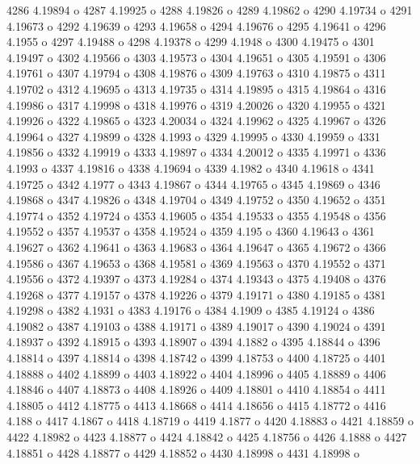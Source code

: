  4286  4.19894  o
 4287  4.19925  o
 4288  4.19826  o
 4289  4.19862  o
 4290  4.19734  o
 4291  4.19673  o
 4292  4.19639  o
 4293  4.19658  o
 4294  4.19676  o
 4295  4.19641  o
 4296  4.1955  o
 4297  4.19488  o
 4298  4.19378  o
 4299  4.1948  o
 4300  4.19475  o
 4301  4.19497  o
 4302  4.19566  o
 4303  4.19573  o
 4304  4.19651  o
 4305  4.19591  o
 4306  4.19761  o
 4307  4.19794  o
 4308  4.19876  o
 4309  4.19763  o
 4310  4.19875  o
 4311  4.19702  o
 4312  4.19695  o
 4313  4.19735  o
 4314  4.19895  o
 4315  4.19864  o
 4316  4.19986  o
 4317  4.19998  o
 4318  4.19976  o
 4319  4.20026  o
 4320  4.19955  o
 4321  4.19926  o
 4322  4.19865  o
 4323  4.20034  o
 4324  4.19962  o
 4325  4.19967  o
 4326  4.19964  o
 4327  4.19899  o
 4328  4.1993  o
 4329  4.19995  o
 4330  4.19959  o
 4331  4.19856  o
 4332  4.19919  o
 4333  4.19897  o
 4334  4.20012  o
 4335  4.19971  o
 4336  4.1993  o
 4337  4.19816  o
 4338  4.19694  o
 4339  4.1982  o
 4340  4.19618  o
 4341  4.19725  o
 4342  4.1977  o
 4343  4.19867  o
 4344  4.19765  o
 4345  4.19869  o
 4346  4.19868  o
 4347  4.19826  o
 4348  4.19704  o
 4349  4.19752  o
 4350  4.19652  o
 4351  4.19774  o
 4352  4.19724  o
 4353  4.19605  o
 4354  4.19533  o
 4355  4.19548  o
 4356  4.19552  o
 4357  4.19537  o
 4358  4.19524  o
 4359  4.195  o
 4360  4.19643  o
 4361  4.19627  o
 4362  4.19641  o
 4363  4.19683  o
 4364  4.19647  o
 4365  4.19672  o
 4366  4.19586  o
 4367  4.19653  o
 4368  4.19581  o
 4369  4.19563  o
 4370  4.19552  o
 4371  4.19556  o
 4372  4.19397  o
 4373  4.19284  o
 4374  4.19343  o
 4375  4.19408  o
 4376  4.19268  o
 4377  4.19157  o
 4378  4.19226  o
 4379  4.19171  o
 4380  4.19185  o
 4381  4.19298  o
 4382  4.1931  o
 4383  4.19176  o
 4384  4.1909  o
 4385  4.19124  o
 4386  4.19082  o
 4387  4.19103  o
 4388  4.19171  o
 4389  4.19017  o
 4390  4.19024  o
 4391  4.18937  o
 4392  4.18915  o
 4393  4.18907  o
 4394  4.1882  o
 4395  4.18844  o
 4396  4.18814  o
 4397  4.18814  o
 4398  4.18742  o
 4399  4.18753  o
 4400  4.18725  o
 4401  4.18888  o
 4402  4.18899  o
 4403  4.18922  o
 4404  4.18996  o
 4405  4.18889  o
 4406  4.18846  o
 4407  4.18873  o
 4408  4.18926  o
 4409  4.18801  o
 4410  4.18854  o
 4411  4.18805  o
 4412  4.18775  o
 4413  4.18668  o
 4414  4.18656  o
 4415  4.18772  o
 4416  4.188  o
 4417  4.1867  o
 4418  4.18719  o
 4419  4.1877  o
 4420  4.18883  o
 4421  4.18859  o
 4422  4.18982  o
 4423  4.18877  o
 4424  4.18842  o
 4425  4.18756  o
 4426  4.1888  o
 4427  4.18851  o
 4428  4.18877  o
 4429  4.18852  o
 4430  4.18998  o
 4431  4.18998  o
